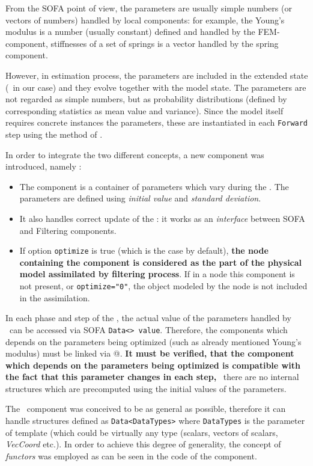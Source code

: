 \documentclass[10pt]{article}
\begin{document}
From the SOFA point of view, the parameters are usually simple numbers (or vectors of numbers) handled by local components: for example, the Young's modulus is a number (usually constant) defined and handled by the FEM-component, stiffnesses of a set of springs is a vector handled by the spring component.

However, in estimation process, the parameters are included in the extended  state (\sstate\ in our case) and they evolve together with the model state. The parameters are not regarded as simple numbers, but as probability distributions (defined by corresponding statistics as mean value and variance). Since the model itself requires concrete instances the parameters, these are instantiated in each \texttt{Forward} step using the method of \smp.

In order to integrate the two different concepts, a new component was introduced, namely \opr:
\begin{itemize}
\item The component is a container of parameters which vary during the \ssda. The parameters are defined using \emph{initial value} and \emph{standard deviation}.
\item It also handles correct update of the \sstate: it works as an \emph{interface} between SOFA and Filtering components. 
\item If option \texttt{optimize} is true (which is the case by default), \textbf{the node containing the component is considered as the part of the physical model assimilated by filtering process}. If in a node this component is not present, or \texttt{optimize="0"}, the object modeled by the node is not included in the assimilation.
\end{itemize}
In each phase and step of the \ssda, the actual value of the parameters handled by \opr\ can be accessed via SOFA \texttt{Data<> value}. Therefore, the components which depends on the parameters being optimized (such as already mentioned Young's modulus) must be linked via @. \textbf{It must be verified, that the component which depends on the parameters being optimized is compatible with the fact that this parameter changes in each step,} \ie\ there are no internal structures which are precomputed using the initial values of the parameters.

The \opr\ component was conceived to be as general as possible, therefore it can handle structures defined as \texttt{Data<DataTypes>} where \texttt{DataTypes} is the parameter of template (which could be virtually any type (scalars, vectors of scalars, \emph{VecCoord} etc.). In order to achieve this degree of generality, the concept of \emph{functors} was employed as can be seen in the code of the component.
\end{document}
